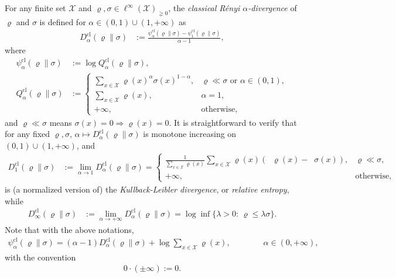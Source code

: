 \documentclass[unsortedaddress,superscriptaddress,pra,notitlepage]{revtex4}
\def\X{{\mathcal X}}
\def\rho{\varrho}
\def\imp{\Longrightarrow}
\def\pne{_{\gneq 0}}
\def\cl{\mathrm{cl}}
\def\cl{\mathrm{cl}}
\newcommand{\ki}[1]{\textit{\textit{#1}}}
\newcommand{\ds}{\mbox{ }\mbox{ }}
\DeclareMathOperator{\logn}{\widehat\log}
\begin{document}
For any finite set $\X$ and $\rho,\sigma\in\ell^{\infty}(\X)\pne$, 
the 
\ki{classical R\'enyi $\alpha$-divergence} of $\rho$ and $\sigma$ is defined for 
$\alpha\in(0,1)\cup(1,+\infty)$ as \cite{Renyi}
\begin{align*}
D_{\alpha}^{\cl}(\rho\|\sigma)
&:=
\frac{\psi_{\alpha}^{\cl}(\rho\|\sigma)-\psi_{1}^{\cl}(\rho\|\sigma)}{\alpha-1},
\end{align*}
where
\begin{align*}
\psi_{\alpha}^{\cl}(\rho\|\sigma)&:=\log Q_{\alpha}^{\cl}(\rho\|\sigma),\\
Q_{\alpha}^{\cl}(\rho\|\sigma)
&:=\begin{cases}
\sum_{x\in\X}\rho(x)^{\alpha}\sigma(x)^{1-\alpha},&\rho\ll\sigma\text{ or }\alpha\in(0,1),\\
\sum_{x\in\X}\rho(x),&\alpha=1,\\
+\infty,&\text{otherwise},
\end{cases}
\end{align*}
and $\rho\ll\sigma$ means $\sigma(x)=0\imp\rho(x)=0$.
It is straightforward to verify that for any fixed $\rho,\sigma$, $
\alpha\mapsto D_{\alpha}^{\cl}(\rho\|\sigma)$ is monotone increasing on $(0,1)\cup(1,+\infty)$, and 
\begin{align*}
D_{1}^{\cl}(\rho\|\sigma)
&:=\lim_{\alpha\to1}
D_{\alpha}^{\cl}(\rho\|\sigma)
=
\begin{cases}
\frac{1}{\sum_{x\in\X}\rho(x)}\sum_{x\in\X}\rho(x)(\logn\rho(x)-\logn\sigma(x)),& \rho\ll\sigma,\\
+\infty,&\text{otherwise},
\end{cases}
\end{align*}
is (a normalized version of) the \ki{Kullback-Leibler divergence}, or \ki{relative entropy}, 
while
\begin{align*}
D_{\infty}^{\cl}(\rho\|\sigma)
&:=\lim_{\alpha\to+\infty}
D_{\alpha}^{\cl}(\rho\|\sigma)
=
\log\inf\{\lambda>0:\,\rho\le\lambda\sigma\}.
\end{align*}
Note that with the above notations,
\begin{align*}
\psi_{\alpha}^{\cl}(\rho\|\sigma)
=(\alpha-1)D_{\alpha}^{\cl}(\rho\|\sigma)+\log\sum\nolimits_{x\in\X}\rho(x),\ds\ds\ds
\alpha\in(0,+\infty),
\end{align*}
with the convention
\begin{align*}
0\cdot(\pm\infty):=0.
\end{align*}
\end{document}
